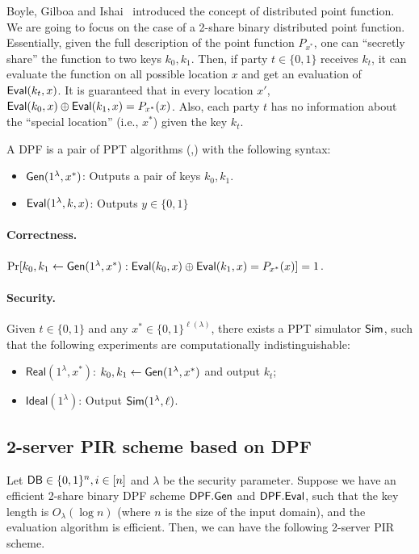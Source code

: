 Boyle, Gilboa and Ishai~\cite{boyle2016function} introduced the concept of distributed point function. 
We are going to focus on the case of a 2-share binary distributed point function. 
Essentially, given the full description of the point function $P_{x^*}$, one can ``secretly share'' the function to two keys $k_0,k_1$. Then, if party $t\in\{0,1\}$ receives $k_t$, it can evaluate the function on all possible location $x$ and get an evaluation of ${\sf Eval}(k_t, x)$. 
It is guaranteed that in every location $x'$, ${\sf Eval}(k_0, x)\oplus{\sf Eval}(k_1, x)=P_{x^*}(x)$.
Also, each party $t$ has no information about the ``special location'' (i.e., $x^*$) given the key $k_t$.


\begin{definition}
    A DPF is a pair of PPT algorithms (\Gen,\Eval) with the following syntax:
    \hfill
    \begin{itemize}
        \item ${\sf Gen}(1^\lambda,x^*)$: Outputs a pair of keys $k_0,k_1$.
        \item ${\sf Eval}(1^\lambda, k,x)$: Outputs $y \in \{0,1\}$
    \end{itemize}
    \paragraph{Correctness.} $\Pr[k_0,k_1 \leftarrow {\sf Gen}(1^\lambda, x^*):{\sf Eval}(k_0,x) \oplus {\sf Eval}(k_1,x) = P_{x^*}(x)] = 1$.
    \paragraph{Security.} Given $t\in\{0,1\}$ and any $x^*\in \{0,1\}^{\ell(\lambda)}$, there exists a PPT simulator ${\sf Sim}$, such that the following experiments are computationally indistinguishable:
    \begin{itemize}
        \item $\mathsf{Real}(1^\lambda, x^*)$: $k_0,k_1\leftarrow  {\sf Gen}(1^\lambda, x^*)$ and output $k_t$;
        \item $\mathsf{Ideal}(1^\lambda)$: Output ${\sf Sim}(1^\lambda, \ell)$.
    \end{itemize}
\end{definition}


\subsection{2-server PIR scheme based on DPF}

Let ${\sf DB} \in \{0,1\}^{n}, i \in [n]$ and $\lambda$ be the security parameter.
Suppose we have an efficient 2-share binary DPF scheme ${\sf DPF.Gen}$ and ${\sf DPF.Eval}$, such that the key length is $O_\lambda(\log n)$ (where $n$ is the size of the input domain), and the evaluation algorithm is efficient. 
Then, we can have the following 2-server PIR scheme. %

